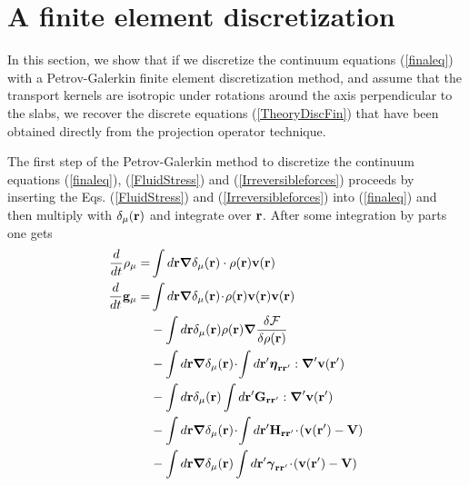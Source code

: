 \documentclass[b5paper,openright,11pt]{book}
\newcommand{\esc}{\!\cdot\!}
\begin{document}
\section{A finite element discretization}
\label{Sec:Galerkin}
In this section, we show that if we discretize the continuum equations
(\ref{finaleq}) with  a Petrov-Galerkin finite  element discretization
method,  and assume  that the  transport kernels  are isotropic  under
rotations  around the axis  perpendicular  to the  slabs,  we recover  the
discrete equations (\ref{TheoryDiscFin}) that have been obtained directly
from the projection operator technique.

The  first  step  of  the Petrov-Galerkin  method  to  discretize  the
continuum  equations  (\ref{finaleq}),  (\ref{FluidStress}) and (\ref{Irreversibleforces})  proceeds  by
inserting the Eqs. (\ref{FluidStress}) and (\ref{Irreversibleforces}) into (\ref{finaleq}) and then multiply with
$\delta_\mu({\bf  r})$  and  integrate  over ${\bf  r}$.   After  some
integration by parts one gets
\begin{align}
\frac{d}{dt}\rho_\mu=&\int d{\bf r}\boldsymbol{\nabla}\delta_\mu({\bf r})\cdot\rho({\bf r}){\bf v}({\bf r})
\nonumber\\
\frac{d}{dt}{\bf g}_\mu=&\int d{\bf r}\boldsymbol{\nabla}\delta_\mu({\bf r})\esc\rho({\bf r}){\bf v}({\bf r}){\bf v}({\bf r})
\nonumber\\
&-\int d{\bf r}\delta_\mu({\bf r})\rho({\bf r})\boldsymbol{\nabla}\frac{\delta{\cal F}}{\delta\rho({\bf r})}
\nonumber\\
&-\int d{\bf r}\boldsymbol{\nabla}\delta_\mu({\bf r})\esc
\int d{\bf r}'\boldsymbol{\eta}_{{\bf r}{\bf r}'}:{\boldsymbol{\nabla}^\prime}{\bf v}({\bf r}')
\nonumber\\
&-\int d{\bf r}\delta_\mu({\bf r})\int d{\bf r}'{\bf G}_{{\bf r}{\bf r}'}:
{\boldsymbol{\nabla}^\prime} {\bf v}({\bf r}')
\nonumber\\
&-\int d{\bf r}\boldsymbol{\nabla}\delta_\mu({\bf r})\esc \int d{\bf r}'{\bf H}_{{\bf r}{\bf r}'}
\esc ( {\bf v}({\bf r}')-{\bf V})
\nonumber\\
&-\int d{\bf r}\boldsymbol{\nabla}\delta_\mu({\bf r})\int d{\bf r}'
\boldsymbol{\gamma}_{{\bf r}{\bf r}'}\esc( {\bf v}({\bf r}')
-{\bf V})
\label{fulldelta}
\end{align}
\end{document}
